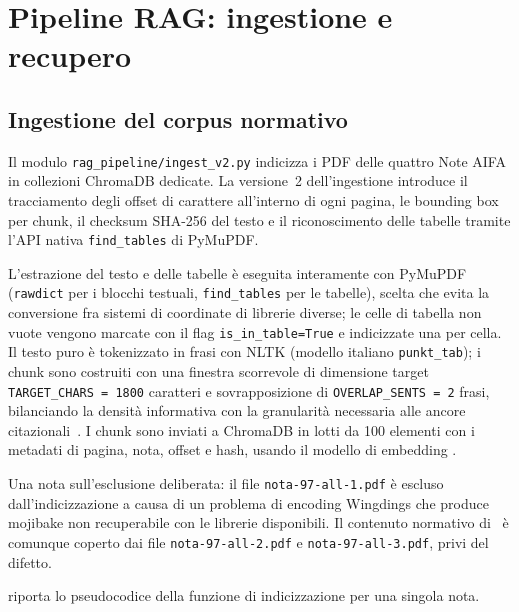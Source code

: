 \section{Pipeline RAG: ingestione e recupero}
\label{sec:rag-impl}

\subsection{Ingestione del corpus normativo}

Il modulo \texttt{rag\_pipeline/ingest\_v2.py} indicizza i PDF delle quattro
Note AIFA in collezioni ChromaDB dedicate. La versione~2 dell'ingestione
introduce il tracciamento degli offset di carattere all'interno di ogni
pagina, le bounding box per chunk, il checksum SHA-256 del testo e il
riconoscimento delle tabelle tramite l'API nativa \texttt{find\_tables} di
PyMuPDF.

L'estrazione del testo e delle tabelle è eseguita interamente con PyMuPDF
(\texttt{rawdict} per i blocchi testuali, \texttt{find\_tables} per le
tabelle), scelta che evita la conversione fra sistemi di coordinate di
librerie diverse; le celle di tabella non vuote vengono marcate con il flag
\texttt{is\_in\_table=True} e indicizzate una per cella. Il testo puro è
tokenizzato in frasi con NLTK (modello italiano \texttt{punkt\_tab});
i chunk sono costruiti con una finestra scorrevole di dimensione target
\texttt{TARGET\_CHARS = 1800} caratteri e sovrapposizione di
\texttt{OVERLAP\_SENTS = 2} frasi, bilanciando la densità informativa con la
granularità necessaria alle ancore citazionali~\cite{gao2023ragsurvey}. I
chunk sono inviati a ChromaDB in lotti da 100 elementi con i metadati di
pagina, nota, offset e hash, usando il modello di embedding \embedmodel.

Una nota sull'esclusione deliberata: il file \texttt{nota-97-all-1.pdf} è
escluso dall'indicizzazione a causa di un problema di encoding Wingdings che
produce mojibake non recuperabile con le librerie disponibili. Il contenuto
normativo di \notenova\ è comunque coperto dai file \texttt{nota-97-all-2.pdf}
e \texttt{nota-97-all-3.pdf}, privi del difetto.

 riporta lo pseudocodice della funzione di indicizzazione
per una singola nota.

